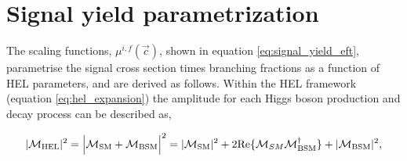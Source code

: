 

\section{Signal yield parametrization}\label{sec:eft_parametrisation}
The scaling functions, $\mu^{i,f}(\vec{c})$, shown in equation \ref{eq:signal_yield_eft}, parametrise the signal cross section times branching fractions as a function of HEL parameters, and are derived as follows. Within the HEL framework (equation \ref{eq:hel_expansion}) the amplitude for each Higgs boson production and decay process can be described as,

\begin{equation}\label{eq:hel_matrixelement}
    |\mathcal{M}_{\rm{HEL}}|^2 = \Big| \mathcal{M}_{\rm{SM}} + \mathcal{M}_{\rm{BSM}} \Big|^2 = |\mathcal{M}_{\rm{SM}}|^2 + 2{\rm{Re}}\{\mathcal{M}_{SM}\mathcal{M}^{\dagger}_{\rm{BSM}}\} + |\mathcal{M}_{\rm{BSM}}|^2,
\end{equation}

